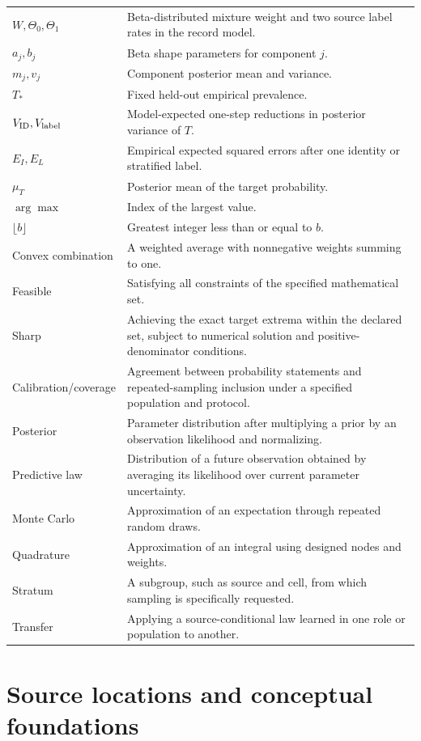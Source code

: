 \documentclass[11pt,a4paper]{report}
\begin{document}
\begin{longtable}{p{}p{}}
$W,\Theta_0,\Theta_1$ & Beta-distributed mixture weight and two source label rates in the record model.\\
$a_j,b_j$ & Beta shape parameters for component $j$.\\
$m_j,v_j$ & Component posterior mean and variance.\\
$T_*$ & Fixed held-out empirical prevalence.\\
$V_{\rm ID},V_{\rm label}$ & Model-expected one-step reductions in posterior variance of $T$.\\
$E_I,E_L$ & Empirical expected squared errors after one identity or stratified label.\\
$\mu_T$ & Posterior mean of the target probability.\\
$\arg\max$ & Index of the largest value.\\
$\lfloor b\rfloor$ & Greatest integer less than or equal to $b$.\\
Convex combination & A weighted average with nonnegative weights summing to one.\\
Feasible & Satisfying all constraints of the specified mathematical set.\\
Sharp & Achieving the exact target extrema within the declared set, subject to numerical solution and positive-denominator conditions.\\
Calibration/coverage & Agreement between probability statements and repeated-sampling inclusion under a specified population and protocol.\\
Posterior & Parameter distribution after multiplying a prior by an observation likelihood and normalizing.\\
Predictive law & Distribution of a future observation obtained by averaging its likelihood over current parameter uncertainty.\\
Monte Carlo & Approximation of an expectation through repeated random draws.\\
Quadrature & Approximation of an integral using designed nodes and weights.\\
Stratum & A subgroup, such as source and cell, from which sampling is specifically requested.\\
Transfer & Applying a source-conditional law learned in one role or population to another.\\\bottomrule
\end{longtable}

\chapter{Source locations and conceptual foundations}

\end{document}
